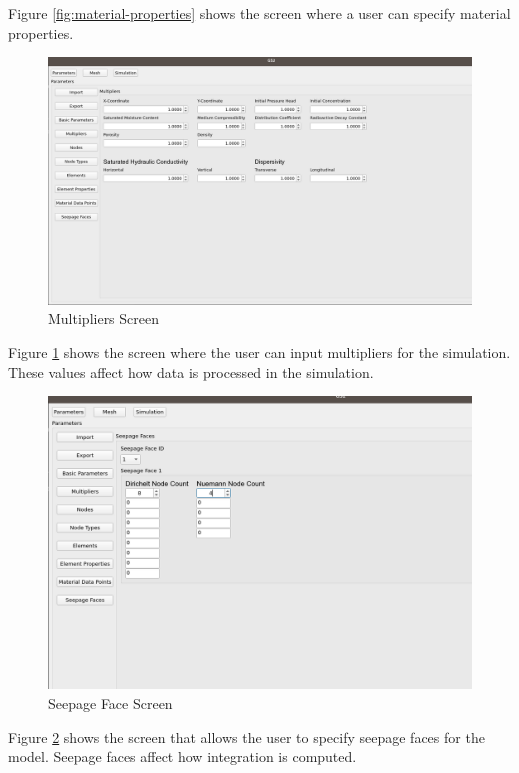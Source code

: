 \documentclass[onecolumn, draftclsnofoot,10pt, compsoc]{IEEEtran}
\begin{document}
Figure \ref{fig:material-properties} shows the screen where a user can specify material properties. 
\begin{figure}[H]
    \centering
    \includegraphics[scale=0.3]{multipliers-scree.png}
    \caption{Multipliers Screen}
    \label{fig:multipliers}
\end{figure}{}
Figure \ref{fig:multipliers} shows the screen where the user can input multipliers for the simulation. These values affect how data is processed in the simulation. 
\begin{figure}[H]
    \centering
    \includegraphics[scale=0.3]{seepage-face.png}
    \caption{Seepage Face Screen}
    \label{fig:seepage-face}
\end{figure}{}
Figure \ref{fig:seepage-face} shows the screen that allows the user to specify seepage faces for the model. Seepage faces affect how integration is computed. 
\end{document}
